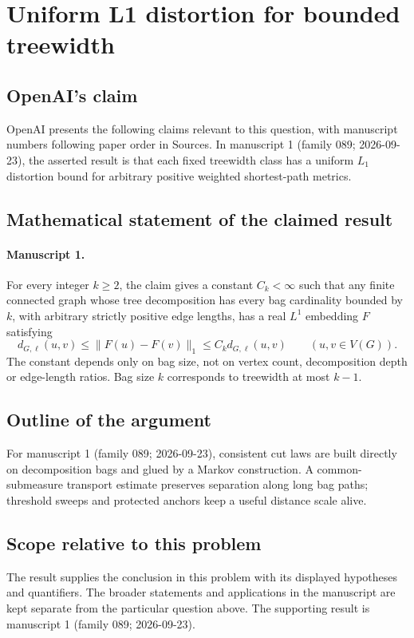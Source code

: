 \documentclass[11pt]{article}
\begin{document}
\section*{Uniform L1 distortion for bounded treewidth}

\subsection{OpenAI's claim}
OpenAI presents the following claims relevant to this question, with manuscript numbers following paper order in Sources. In manuscript 1 (family 089; 2026-09-23), the asserted result is that each fixed treewidth class has a uniform $L_1$ distortion bound for arbitrary positive weighted shortest-path metrics.

\subsection{Mathematical statement of the claimed result}
\paragraph{Manuscript 1.}
For every integer $k\ge2$, the claim gives a constant $C_k<\infty$ such that any finite connected graph whose tree decomposition has every bag cardinality bounded by $k$, with arbitrary strictly positive edge lengths, has a real $L^1$ embedding $F$ satisfying
\[
 d_{G,\ell}(u,v)\le\|F(u)-F(v)\|_1\le C_kd_{G,\ell}(u,v)
 \qquad(u,v\in V(G)).
\]
The constant depends only on bag size, not on vertex count, decomposition depth or edge-length ratios. Bag size $k$ corresponds to treewidth at most $k-1$.

\subsection{Outline of the argument}
For manuscript 1 (family 089; 2026-09-23), consistent cut laws are built directly on decomposition bags and glued by a Markov construction. A common-submeasure transport estimate preserves separation along long bag paths; threshold sweeps and protected anchors keep a useful distance scale alive.

\subsection{Scope relative to this problem}
The result supplies the conclusion in this problem with its displayed hypotheses and quantifiers. The broader statements and applications in the manuscript are kept separate from the particular question above. The supporting result is manuscript 1 (family 089; 2026-09-23).
\end{document}
